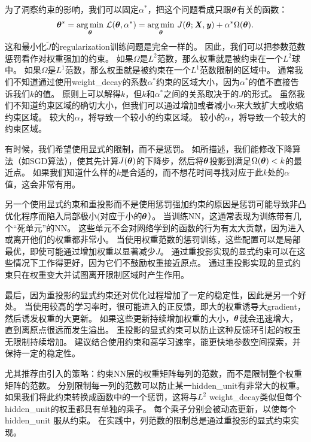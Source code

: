 为了洞察约束的影响，我们可以固定$\alpha^*$，把这个问题看成只跟$\boldsymbol{\theta}$有关的函数：
\begin{align}
 \boldsymbol{\theta}^* =  \underset{\boldsymbol{\theta}}{ \arg\min} ~\mathcal{L}(\boldsymbol{\theta}, \alpha^*) = 
 \underset{\boldsymbol{\theta}}{ \arg\min}~
 J(\boldsymbol{\theta}; \boldsymbol{\mathit{X}}, \boldsymbol{\mathit{y}}) + \alpha^* \Omega(\boldsymbol{\theta}).
\end{align}
这和最小化$\tilde J$的\gls{regularization}训练问题是完全一样的。
因此，我们可以把参数范数惩罚看作对权重强加的约束。
如果$\Omega$是$L^2$范数，那么权重就是被约束在一个$L^2$球中。
如果$\Omega$是$L^1$范数，那么权重就是被约束在一个$L^1$范数限制的区域中。
通常我们不知道通过使用\gls{weight_decay}的系数$\alpha^*$约束的区域大小，因为$\alpha^*$的值不直接告诉我们$k$的值。
原则上可以解得$k$，但$k$和$\alpha^*$之间的关系取决于的$J$的形式。
虽然我们不知道约束区域的确切大小，但我们可以通过增加或者减小$\alpha$来大致扩大或收缩约束区域。
较大的$\alpha$，将导致一个较小的约束区域。
较小的$\alpha$，将导致一个较大的约束区域。


有时候，我们希望使用显式的限制，而不是惩罚。
如所描述，我们能修改下降算法（如\gls{SGD}算法），使其先计算$J(\boldsymbol{\theta})$的下降步，然后将$\boldsymbol{\theta}$投影到满足$\Omega(\boldsymbol{\theta}) < k$的最近点。
如果我们知道什么样的$k$是合适的，而不想花时间寻找对应于此$k$处的$\alpha$值，这会非常有用。

另一个使用显式约束和重投影而不是使用惩罚强加约束的原因是惩罚可能导致非凸优化程序而陷入局部极小(对应于小的$\boldsymbol{\theta}$）。
当训练\gls{NN}，这通常表现为训练带有几个``死单元''的\gls{NN}。
这些单元不会对网络学到的函数的行为有太大贡献，因为进入或离开他们的权重都非常小。
当使用权重范数的惩罚训练，这些配置可以是局部最优，即使可能通过增加权重以显著减少$J$。
通过重投影实现的显式约束可以在这些情况下工作得更好，因为它们不鼓励权重接近原点。
通过重投影实现的显式约束只在权重变大并试图离开限制区域时产生作用。

最后，因为重投影的显式约束还对优化过程增加了一定的稳定性，因此是另一个好处。
当使用较高的学习率时，很可能进入的正反馈，即大的权重诱导大\gls{gradient}，然后诱发权重的大更新。
如果这些更新持续增加权重的大小，$\boldsymbol{\theta}$就会迅速增大，直到离原点很远而发生溢出。
重投影的显式约束可以防止这种反馈环引起的权重无限制持续增加。
\cite{Hinton-et-al-arxiv2012}建议结合使用约束和高学习速率，能更快地参数空间探索，并保持一定的稳定性。


\cite{Hinton-et-al-arxiv2012}尤其推荐由\cite{Srebro05}引入的策略：约束\gls{NN}层的权重矩阵每列的范数，而不是限制整个权重矩阵的范数。
分别限制每一列的范数可以防止某一\gls{hidden_unit}有非常大的权重。
如果我们将此约束转换成函数中的一个惩罚，这将与$L^2$ \gls{weight_decay}类似但每个\gls{hidden_unit}的权重都具有单独的乘子。
每个乘子分别会被动态更新，以使每个\gls{hidden_unit} 服从约束。
在实践中，列范数的限制总是通过重投影的显式约束实现。

